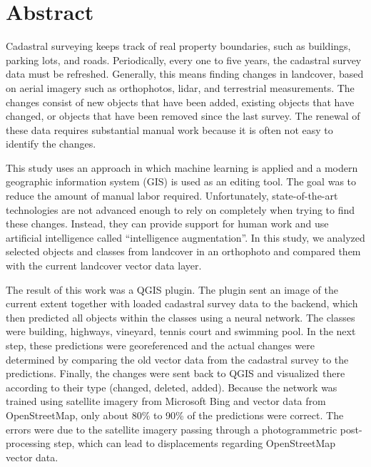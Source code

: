 \cleardoublepage
\markleft{\abstractname}

\chapter*{Abstract}
Cadastral surveying keeps track of real property boundaries, such as buildings, parking lots, and roads. Periodically, every one to five years, the cadastral survey data must be refreshed. Generally, this means finding changes in landcover, based on aerial imagery such as orthophotos, lidar, and terrestrial measurements. The changes consist of new objects that have been added, existing objects that have changed, or objects that have been removed since the last survey. The renewal of these data requires substantial manual work because it is often not easy to identify the changes.

This study uses an approach in which machine learning is applied and a modern geographic information system (GIS) is used as an editing tool. The goal was to reduce the amount of manual labor required. Unfortunately, state-of-the-art technologies are not advanced enough to rely on completely when trying to find these changes. Instead, they can provide support for human work and use artificial intelligence called “intelligence augmentation”. In this study, we analyzed selected objects and classes from landcover in an orthophoto and compared them with the current landcover vector data layer.

The result of this work was a QGIS plugin. The plugin sent an image of the current extent together with loaded cadastral survey data to the backend, which then predicted all objects within the classes using a neural network. The classes were building, highways, vineyard, tennis court and swimming pool. In the next step, these predictions were georeferenced and the actual changes were determined by comparing the old vector data from the cadastral survey to the predictions. Finally, the changes were sent back to QGIS and visualized there according to their type (changed, deleted, added). Because the network was trained using satellite imagery from Microsoft Bing and vector data from OpenStreetMap, only about 80\% to 90\% of the predictions were correct. The errors were due to the satellite imagery passing through a photogrammetric post-processing step, which can lead to displacements regarding OpenStreetMap vector data.
